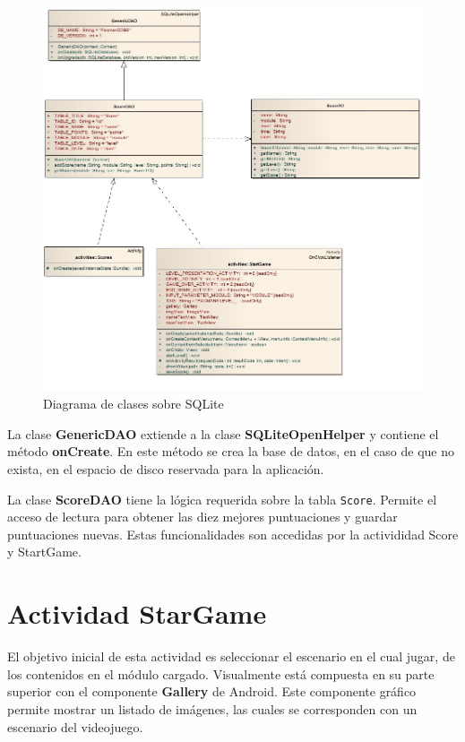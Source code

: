 \begin{figure}[!h]
	\centering	
	\includegraphics[width=15.5cm]{img/DiagramaClases_DAO.jpg}
	\caption{Diagrama de clases sobre SQLite}
\end{figure}

La clase \textbf{GenericDAO} extiende a la clase \textbf{SQLiteOpenHelper} y contiene el método \textbf{onCreate}. En este método se crea la base de datos, en el caso de que no exista,  en el espacio de disco reservada para la aplicación.
\newline

La clase \textbf{ScoreDAO} tiene la lógica requerida sobre la tabla \texttt{Score}. Permite el acceso de lectura para obtener las diez mejores puntuaciones y guardar puntuaciones nuevas. Estas funcionalidades son accedidas por la activididad Score y StartGame.



\section{Actividad StarGame}

El objetivo inicial de esta actividad es seleccionar el escenario en el cual jugar, de los contenidos en el módulo cargado. Visualmente está compuesta en su parte superior con el componente \textbf{Gallery} de Android. Este componente gráfico permite mostrar un listado de imágenes, las cuales se corresponden con un escenario del videojuego. 
\newline

